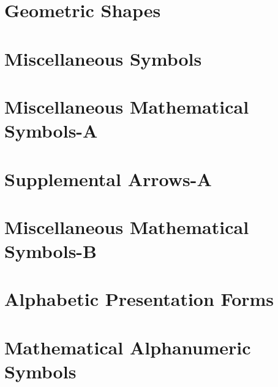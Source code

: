 \documentclass{article}
\begin{document}
\section{Geometric Shapes}

\section{Miscellaneous Symbols}

%
\section{Miscellaneous Mathematical Symbols-A}

\section{Supplemental Arrows-A}

%
%
\section{Miscellaneous Mathematical Symbols-B}

%
%
\section{Alphabetic Presentation Forms}

\section{Mathematical Alphanumeric Symbols}
\end{document}
